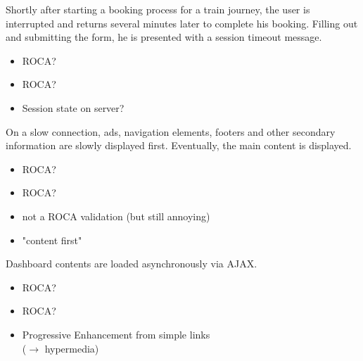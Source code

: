 \documentclass{beamer}
\newcommand{\rocaok}{\ding{51}}
\newcommand{\rocafail}{\ding{55}}
\begin{document}
\begin{frame}
  Shortly after starting a booking process for a train journey, the user is
  interrupted and returns several minutes later to complete his booking. Filling
  out and submitting the form, he is presented with a session timeout message.

  \vspace{0.3cm}
  \begin{itemize}
    \item<1|only@1>[\Large $\square$] \Large ROCA?
    \item<2|only@2>[\Large \rocafail] \Large ROCA?
    \item<2> Session state on server?
  \end{itemize}

\end{frame}

\begin{frame}
  On a slow connection, ads, navigation elements, footers and other secondary
  information are slowly displayed first. Eventually, the main content is displayed.

  \vspace{0.3cm}
  \begin{itemize}
    \item<1|only@1>[\Large $\square$] \Large ROCA?
    \item<2|only@2>[\Large ?] \Large ROCA?
    \item<2> not a ROCA validation (but still annoying)
    \item<2> "content first"
  \end{itemize}

\end{frame}

\begin{frame}
  Dashboard contents are loaded asynchronously via AJAX.

  \vspace{0.3cm}
  \begin{itemize}
    \item<1|only@1>[\Large $\square$] \Large ROCA?
    \item<2|only@2>[\Large \rocaok] \Large ROCA?
    \item<2> Progressive Enhancement from simple links \\ (\ensuremath{\rightarrow} hypermedia)
  \end{itemize}

\end{frame}
\end{document}
